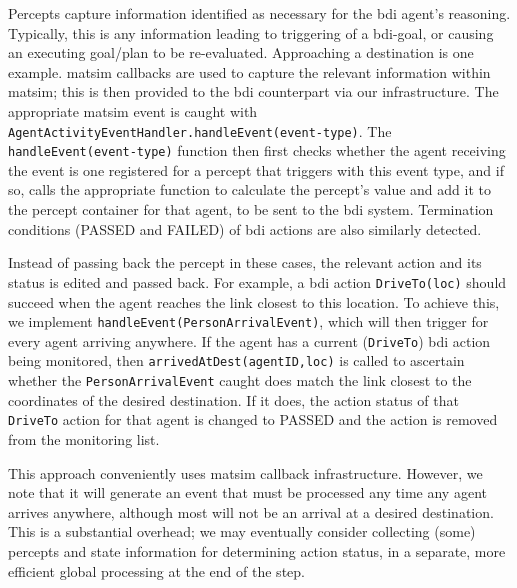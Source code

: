 Percepts capture information identified as
necessary for the \gls{bdi} agent's reasoning. Typically, this is any
information leading to triggering of a \gls{bdi}-goal, or 
causing an executing goal/plan to be re-evaluated. 
Approaching a destination is one example. \gls{matsim} callbacks are used to capture the relevant
information within \gls{matsim}; this is then provided to the \gls{bdi}
counterpart via our infrastructure. The appropriate \gls{matsim} event is
caught with
 \lstinline{AgentActivityEventHandler.handleEvent(event-type)}.  The
\lstinline{handleEvent(event-type)} function then first checks whether the
agent receiving the event is one registered for a percept that
triggers with this event type, and if so, calls the appropriate function
to calculate the percept's value and add it to the percept
container for that agent, to be sent to the \gls{bdi} system. Termination
conditions (PASSED and FAILED) of \gls{bdi} actions are also similarly detected.

Instead of passing back the percept in these cases, the relevant
action and its status is edited and passed back.  For example, a \gls{bdi}
action \lstinline{DriveTo(loc)} should succeed when the agent reaches the
link closest to this location. To achieve this, we implement 
\lstinline{handleEvent(PersonArrivalEvent)}, which will then trigger for every
agent arriving anywhere. If the agent has a current (\lstinline{DriveTo})
\gls{bdi} action being monitored, then \lstinline{arrivedAtDest(agentID,loc)} is
called to ascertain whether the \lstinline{PersonArrivalEvent} caught
does match the link closest to the coordinates of the desired
destination. If it does, the action status of that \lstinline{DriveTo} action for
that agent is changed to PASSED and the action is removed from the monitoring
list.

This approach conveniently uses \gls{matsim} callback
infrastructure. However, we note that it will generate an event that
must be processed any time any agent arrives anywhere, although most
will not be an arrival at a desired destination. This is a
substantial overhead; we may eventually consider collecting (some)
percepts and state information for determining action status, in a
separate, more efficient global processing at the end of the step.

